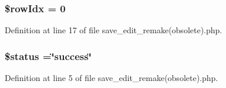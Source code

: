 \hypertarget{save__edit__remake_07obsolete_08_8php_a2457f3fab8183bd163626612df265a7e}{
\subsubsection[{\$row\-Idx}]{\setlength{\rightskip}{0pt plus 5cm}\$row\-Idx = 0}}\label{save__edit__remake_07obsolete_08_8php_a2457f3fab8183bd163626612df265a7e}


Definition at line 17 of file save\-\_\-edit\-\_\-remake(obsolete).\-php.

\hypertarget{save__edit__remake_07obsolete_08_8php_a58391ea75f2d29d5d708d7050b641c33}{
\subsubsection[{\$status}]{\setlength{\rightskip}{0pt plus 5cm}\$status =\char`\"{}success\char`\"{}}}\label{save__edit__remake_07obsolete_08_8php_a58391ea75f2d29d5d708d7050b641c33}


Definition at line 5 of file save\-\_\-edit\-\_\-remake(obsolete).\-php.

